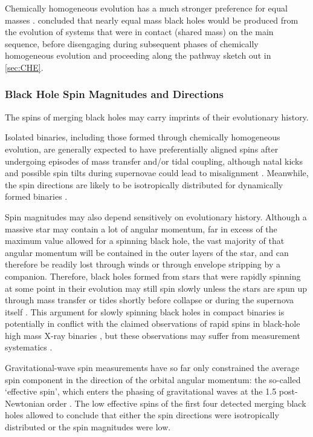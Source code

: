 \documentclass[iop,onecolumn]{revtex4}
\begin{document}
Chemically homogeneous evolution has a much stronger preference for equal masses \citep{MandeldeMink:2016}.  \citep{Marchant:2016} concluded that nearly equal mass black holes would be produced from the evolution of systems that were in contact (shared mass) on the main sequence, before disengaging during subsequent phases of chemically homogeneous evolution and proceeding along the pathway sketch out in \autoref{sec:CHE}. 

\subsubsection{Black Hole Spin Magnitudes and Directions}
The spins of merging black holes may carry imprints of their evolutionary history. 

Isolated binaries, including those formed through chemically homogeneous evolution, are generally expected to have preferentially aligned spins after undergoing episodes of mass transfer and/or tidal coupling, although natal kicks and possible spin tilts during supernovae could lead to misalignment \citep[e.g.,][]{Farr:2011}.  Meanwhile, the spin directions are likely to be isotropically distributed for dynamically formed binaries \citep[e.g.,][]{Rodriguez:2016spin}.

Spin magnitudes may also depend sensitively on evolutionary history.  Although a massive star may contain a lot of angular momentum, far in excess of the maximum value allowed for a spinning black hole, the vast majority of that angular momentum will be contained in the outer layers of the star, and can therefore be readily lost through winds or through envelope stripping by a companion.  Therefore, black holes formed from stars that were rapidly spinning at some point in their evolution may still spin slowly unless the stars are spun up through mass transfer or tides shortly before collapse \citep{Kushnir:2016,HotokezakaPiran:2017,Zaldarriaga:2017} or during the supernova itself \citep{Batta:2017,Schroeder:2018}.   This argument for slowly spinning black holes in compact binaries is potentially in conflict with the claimed observations of rapid spins in black-hole high mass X-ray binaries \citep{MillerMiller:2015}, but these observations may suffer from measurement systematics \citep[e.g.,][]{Kawano:2017}.  

Gravitational-wave spin measurements have so far only constrained the average spin component in the direction of the orbital angular momentum: the so-called `effective spin', which enters the phasing of gravitational waves at the 1.5 post-Newtonian order \citep{PoissonWill:1995}.  The low effective spins of the first four detected merging black holes allowed \citet{Farr:2017} to conclude that either the spin directions were isotropically distributed or the spin magnitudes were low.
\end{document}
